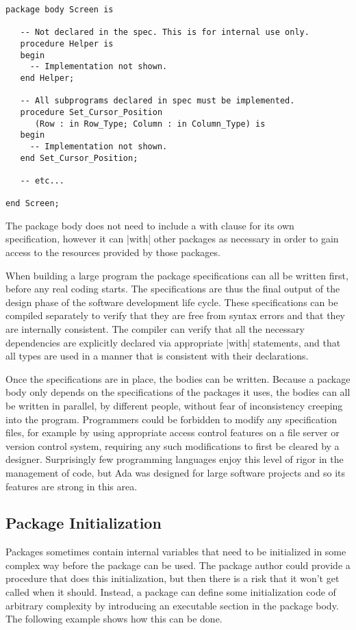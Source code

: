 \begin{lstlisting}
package body Screen is

   -- Not declared in the spec. This is for internal use only.
   procedure Helper is
   begin
     -- Implementation not shown.
   end Helper;

   -- All subprograms declared in spec must be implemented.
   procedure Set_Cursor_Position
      (Row : in Row_Type; Column : in Column_Type) is
   begin
     -- Implementation not shown.
   end Set_Cursor_Position;

   -- etc...

end Screen;
\end{lstlisting}

The package body does not need to include a with clause for its own specification, however it
can |with| other packages as necessary in order to gain access to the resources provided by
those packages.

When building a large program the package specifications can all be written first, before any
real coding starts. The specifications are thus the final output of the design phase of the
software development life cycle. These specifications can be compiled separately to verify that
they are free from syntax errors and that they are internally consistent. The compiler can
verify that all the necessary dependencies are explicitly declared via appropriate |with|
statements, and that all types are used in a manner that is consistent with their declarations.

Once the specifications are in place, the bodies can be written. Because a package body only
depends on the specifications of the packages it uses, the bodies can all be written in
parallel, by different people, without fear of inconsistency creeping into the program.
Programmers could be forbidden to modify any specification files, for example by using
appropriate access control features on a file server or version control system, requiring any
such modifications to first be cleared by a designer. Surprisingly few programming languages
enjoy this level of rigor in the management of code, but Ada was designed for large software
projects and so its features are strong in this area.

\subsection{Package Initialization}

Packages sometimes contain internal variables that need to be initialized in some complex way
before the package can be used. The package author could provide a procedure that does this
initialization, but then there is a risk that it won't get called when it should. Instead, a
package can define some initialization code of arbitrary complexity by introducing an executable
section in the package body. The following example shows how this can be done.

